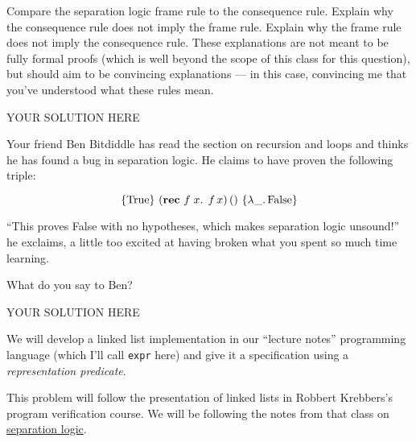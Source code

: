 \documentclass[11pt,twoside]{exam}
\def\fun#1{\lambda #1.\,}
\def\rec#1#2{\text{\textbf{rec} } #1 \; #2.\;\,}
\def\False{\mathrm{False}}
\def\True{\mathrm{True}}
\def\hoare#1#2#3{\left\{#1\right\} \, #2 \, \left\{#3\right\}}
\begin{document}
\begin{questions}
\question
Compare the separation logic frame rule to the consequence rule. Explain why the consequence rule does not imply the frame rule. Explain why the frame rule does not imply the consequence rule. These explanations are not meant to be fully formal proofs (which is well beyond the scope of this class for this question), but should aim to be convincing explanations --- in this case, convincing me that you've understood what these rules mean.

\begin{solution}
  YOUR SOLUTION HERE
\end{solution}

\question
Your friend Ben Bitdiddle has read the section on recursion and loops and thinks he has found a bug in separation logic. He claims to have proven the following triple:

\[
  \hoare{\True}{(\rec{f}{x} f \, x) \, ()}{\fun{\_} \False}
\]

``This proves False with no hypotheses, which makes separation logic unsound!'' he exclaims, a little too excited at having broken what you spent so much time learning.

What do you say to Ben?

\begin{solution}
  YOUR SOLUTION HERE
\end{solution}

\question

We will develop a linked list implementation in our ``lecture notes'' programming language (which I'll call \texttt{expr} here) and give it a specification using a \emph{representation predicate}.

This problem will follow the presentation of linked lists in Robbert Krebbers's
program verification course. We will be following the notes from that class on
\href{https://gitlab.science.ru.nl/program-verification/course-2023-2024/-/blob/master/lectures/week10.md}{separation
logic}.

\end{questions}
\end{document}

